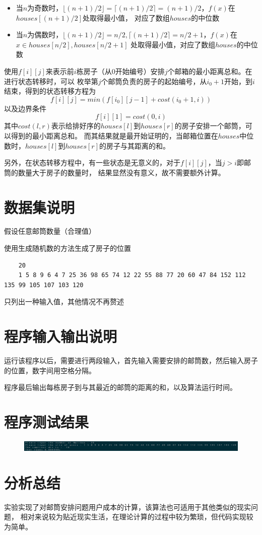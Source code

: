 \documentclass[12pt, a4paper, oneside]{ctexart}
\begin{document}
\begin{itemize}
    \item 当$n$为奇数时，$\lfloor (n+1)/2\rfloor=\lceil (n+1)/2\rceil=(n+1)/2$，$f(x)$在$houses[(n+1)/2]$处取得最小值，
    对应了数组$houses$的中位数
    \item 当$n$为偶数时，$\lfloor (n+1)/2\rfloor=n/2,\lceil (n+1)/2\rceil=n/2 + 1$，$f(x)$在$x \in houses[n/2], houses[n/2+1]$
    处取得最小值，对应了数组$houses$的中位数
\end{itemize}

使用$f[i][j]$来表示前$i$栋房子（从0开始编号）安排$j$个邮箱的最小距离总和。在进行状态转移时，可以
枚举第$j$个邮筒负责的房子的起始编号，从$i_{0}+1$开始，到$i$结束，得到的状态转移方程为
$$
f[i][j] = min(f[i_{0}][j - 1] + cost(i_{0} + 1, i))
$$
以及边界条件
$$
f[i][1] = cost(0,i)
$$
其中$cost(l,r)$表示给排好序的$houses[l]$到$houses[r]$的房子安排一个邮筒，可以得到的最小距离总和。
而其结果就是最开始证明的，当邮箱位置在$houses$中位数时，$houses[l]$到$houses[r]$的房子与其距离的和。

另外，在状态转移方程中，有一些状态是无意义的，对于$f[i][j]$，当$j > i$即邮筒的数量大于房子的数量时，
结果显然没有意义，故不需要额外计算。

\section{数据集说明}
假设任意邮筒数量（合理值）

使用生成随机数的方法生成了房子的位置
\begin{lstlisting}
    20
    1 5 8 9 6 4 7 25 36 98 65 74 12 22 55 88 77 20 60 47 84 152 112 135 99 105 107 103 120
\end{lstlisting}

只列出一种输入值，其他情况不再赘述

\section*{程序输入输出说明}
运行该程序以后，需要进行两段输入，首先输入需要安排的邮筒数，然后输入房子的位置，数字间用空格分隔。

程序最后输出每栋房子到与其最近的邮筒的距离的和，以及算法运行时间。

\section{程序测试结果}
\begin{figure}[H]
    \centering
    \includegraphics[scale=0.3]{2.png}
\end{figure}
\section{分析总结}
实验实现了对邮筒安排问题用户成本的计算，该算法也可适用于其他类似的现实问题，
相对来说较为贴近现实生活，在理论计算的过程中较为繁琐，但代码实现较为简单。
\end{document}
